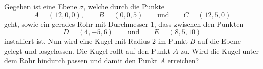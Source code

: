 Gegeben ist eine Ebene $\sigma$, welche durch die Punkte
\[
A=(12,0,0), \qquad
B=(0,0,5) \qquad \text{und}\qquad  
C=(12,5,0)
\]
geht, sowie ein gerades Rohr mit Durchmesser 1,
dass zwischen den Punkten
\[
D=(4,-5,6)   \qquad \text{und}\qquad  
E=(8,5,10) 
\]
installiert ist.
Nun wird eine Kugel mit Radius 2 im Punkt $B$ auf die Ebene gelegt
und losgelassen. Die Kugel rollt auf den Punkt $A$ zu. 
Wird die Kugel unter dem Rohr hindurch passen und damit den Punkt $A$ erreichen?
\begin{center}
\end{center}


